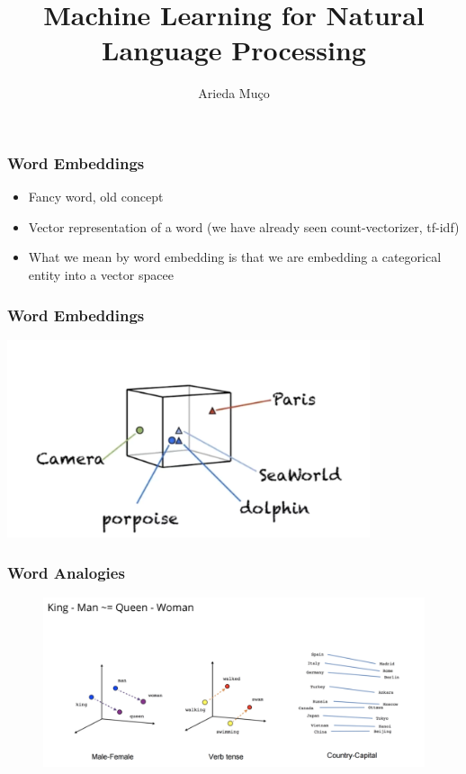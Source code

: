 \documentclass[compress, aspectratio=54]{beamer}
\title[Word Embeddings]{Machine Learning for Natural Language Processing}
\author[Arieda Mu\c co]{Arieda Mu\c co}
\institute[CEU]{Central European University}
\date{}
\begin{document}
\captionsetup[subfigure]{labelformat=empty}

\frame{\titlepage}



\begin{frame}
\frametitle{Word Embeddings}
\begin{itemize}
\item Fancy word, old concept
\item Vector representation of a word (we have already seen count-vectorizer, tf-idf) 
\item What we mean by word embedding is that we are embedding a categorical entity into a vector spacee
\end{itemize}
\end{frame}


\begin{frame}
\frametitle{Word Embeddings}
\begin{center}
    \includegraphics[width=0.8\textwidth]{Figures/word-embeddings}
\end{center}
\end{frame}





\begin{frame}
\frametitle{Word Analogies}
\begin{figure}
\includegraphics[width=1.1\linewidth ]{Figures/word-analogies}
\end{figure}

\end{frame}
\end{document}
